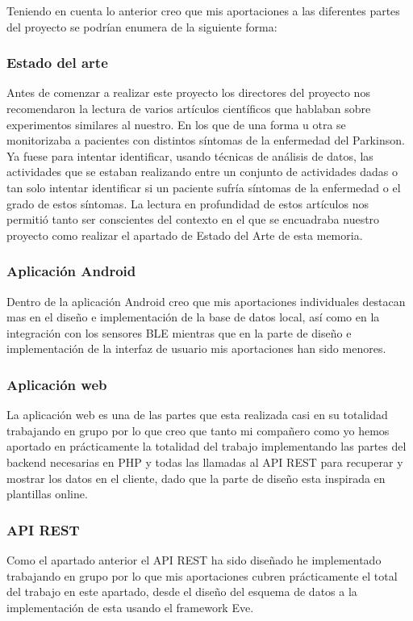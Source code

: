 \documentclass[11pt,spanish]{article}
\begin{document}
Teniendo en cuenta lo anterior creo que mis aportaciones a las diferentes partes del proyecto se podrían enumera de la siguiente forma:

\subsubsection{Estado del arte}
Antes de comenzar a realizar este proyecto los directores del proyecto nos recomendaron la lectura de varios artículos científicos que hablaban sobre experimentos similares al nuestro. En los que de una forma u otra se monitorizaba a pacientes con distintos síntomas de la enfermedad del Parkinson. Ya fuese para intentar identificar, usando técnicas de análisis de datos, las actividades que se estaban realizando entre un conjunto de actividades dadas o tan solo intentar identificar si un paciente sufría síntomas de la enfermedad o el grado de estos síntomas. La lectura en profundidad de estos artículos nos permitió tanto ser conscientes del contexto en el que se encuadraba nuestro proyecto como realizar el apartado de Estado del Arte de esta memoria. 

\subsubsection{Aplicación Android}

Dentro de la aplicación Android creo que mis aportaciones individuales destacan mas en el diseño e implementación de la base de datos local, así como en la integración con los sensores BLE mientras que en la parte de diseño e implementación de la interfaz de usuario mis aportaciones han sido menores.

\subsubsection{Aplicación web}
La aplicación web es una de las partes que esta realizada casi en su totalidad trabajando en grupo por lo que creo que tanto mi compañero como yo hemos aportado en prácticamente la totalidad del trabajo implementando las partes del backend necesarias en PHP y todas las llamadas al API REST para recuperar y mostrar los datos en el cliente, dado que la parte de diseño esta inspirada en plantillas online.

\subsubsection{API REST}
Como el apartado anterior el API REST ha sido diseñado he implementado trabajando en grupo por lo que mis aportaciones cubren prácticamente el total del trabajo en este apartado, desde el diseño del esquema de datos a la implementación de esta usando el framework Eve.
\end{document}
